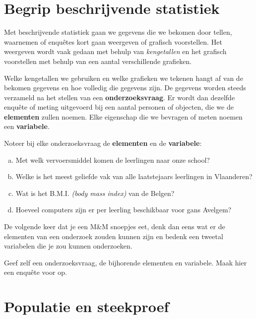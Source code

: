 \documentclass[12pt,twoside,a4paper]{article}
\begin{document}
\pagestyle{fancy}
\fancyhead[RE,LO]{}

\cleardoublepage
\section{Begrip beschrijvende statistiek}

Met beschrijvende statistiek gaan we gegevens die we bekomen door tellen, waarnemen of enquêtes kort gaan weergeven of grafisch voorstellen. Het weergeven wordt vaak gedaan met behulp van {\em kengetallen} en het grafisch voorstellen met behulp van een aantal verschillende grafieken.

Welke kengetallen we gebruiken en welke grafieken we tekenen hangt af van de bekomen gegevens en hoe volledig die gegevens zijn. De gegevens worden steeds verzameld na het stellen van een {\bf onderzoeksvraag}. Er wordt dan dezelfde enquête of meting uitgevoerd bij een aantal personen of objecten, die we de {\bf elementen} zullen noemen. Elke eigenschap die we bevragen of meten noemen een {\bf variabele}.

\begin{oefening}
Noteer bij elke onderzoeksvraag de {\bf elementen} en de {\bf variabele}:
\begin{enumerate}[(a)]
  \item Met welk vervoersmiddel komen de leerlingen naar onze school?
  \item Welke is het meest geliefde vak van alle laatstejaars leerlingen in Vlaanderen?
  \item Wat is het B.M.I. {\em (body mass index)} van de Belgen?
  \item Hoeveel computers zijn er per leerling beschikbaar voor gans Avelgem?
\end{enumerate}
\end{oefening}

\begin{oefening}
  De volgende keer dat je een M\&M snoepjes eet, denk dan eens wat er de elementen van een onderzoek zouden kunnen zijn en bedenk een tweetal variabelen die je zou kunnen onderzoeken.
\end{oefening}

\begin{oefening}
Geef zelf een onderzoeksvraag, de bijhorende elementen en variabele. Maak hier een enquête voor op.
\end{oefening}

\cleardoublepage
\section{Populatie en steekproef}
\end{document}

